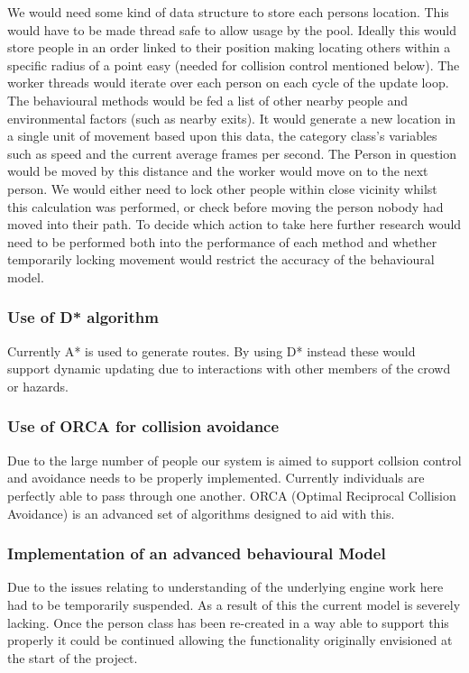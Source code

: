 We would need some kind of data structure to store each persons location.
This would have to be made thread safe to allow usage by the pool.
Ideally this would store people in an order linked to their position
making locating others within a specific radius of a point easy (needed
for collision control mentioned below). The worker threads would iterate
over each person on each cycle of the update loop. The behavioural
methods would be fed a list of other nearby people and environmental
factors (such as nearby exits). It would generate a new location in
a single unit of movement based upon this data, the category class's
variables such as speed and the current average frames per second.
The Person in question would be moved by this distance and the worker
would move on to the next person. We would either need to lock other
people within close vicinity whilst this calculation was performed,
or check before moving the person nobody had moved into their path.
To decide which action to take here further research would need to
be performed both into the performance of each method and whether
temporarily locking movement would restrict the accuracy of the behavioural
model.


\subsubsection*{Use of D{*} algorithm}

Currently A{*} is used to generate routes. By using D{*} instead these
would support dynamic updating due to interactions with other members
of the crowd or hazards.


\subsubsection*{Use of ORCA for collision avoidance}
\label{Problems:subsubsec:ORCA}

Due to the large number of people our system is aimed to support collsion
control and avoidance needs to be properly implemented. Currently
individuals are perfectly able to pass through one another. ORCA (Optimal
Reciprocal Collision Avoidance) is an advanced set of algorithms designed
to aid with this.


\subsubsection*{Implementation of an advanced behavioural Model}

Due to the issues relating to understanding of the underlying engine
work here had to be temporarily suspended. As a result of this the
current model is severely lacking. Once the person class has been
re-created in a way able to support this properly it could be continued
allowing the functionality originally envisioned at the start of the
project.


